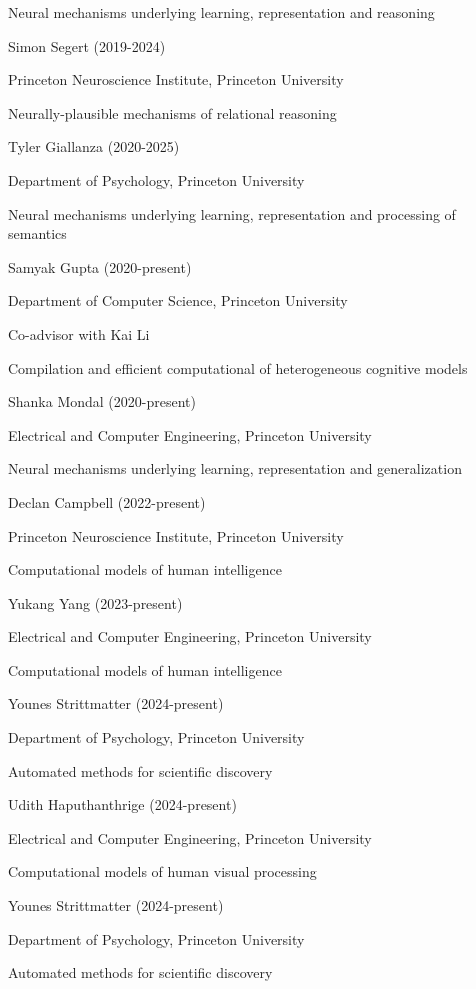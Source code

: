 \documentclass[10 pt]{article}
\begin{document}
Neural mechanisms underlying learning, representation and reasoning
    \medskip

Simon Segert (2019-2024)

Princeton Neuroscience Institute, Princeton University

Neurally-plausible mechanisms of relational reasoning
    \medskip

Tyler Giallanza (2020-2025)

Department of Psychology, Princeton University

Neural mechanisms underlying learning, representation and processing of semantics
    \medskip

Samyak Gupta (2020-present)

Department of Computer Science, Princeton University

Co-advisor with Kai Li

Compilation and efficient computational of heterogeneous cognitive models
    \medskip

Shanka Mondal (2020-present)

Electrical and Computer Engineering, Princeton University

Neural mechanisms underlying learning, representation and generalization
    \medskip

Declan Campbell (2022-present)

Princeton Neuroscience Institute, Princeton University

Computational models of human intelligence
    \medskip

Yukang Yang (2023-present)

Electrical and Computer Engineering, Princeton University

Computational models of human intelligence
    \medskip

Younes Strittmatter (2024-present)

Department of Psychology, Princeton University

Automated methods for scientific discovery
    \medskip

Udith Haputhanthrige (2024-present)

Electrical and Computer Engineering, Princeton University

Computational models of human visual processing
    \medskip

Younes Strittmatter (2024-present)

Department of Psychology, Princeton University

Automated methods for scientific discovery
    \medskip
\end{document}
